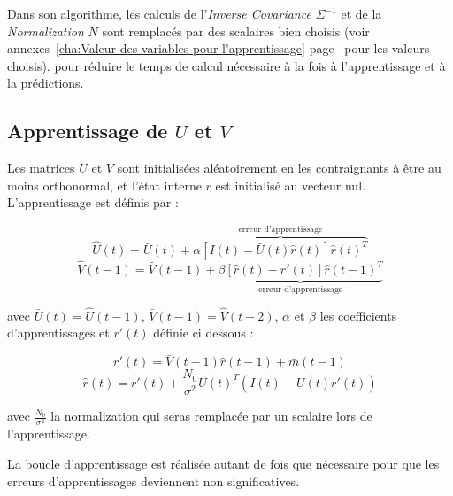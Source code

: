 Dans son algorithme, les calculs de l'\textit{Inverse Covariance} $\Sigma^{-1}$
et de la \textit{Normalization} $N$ sont remplacés par des scalaires bien
choisis (voir annexes~\ref{cha:Valeur des variables pour l'apprentissage}
page~\pageref{cha:Valeur des variables pour l'apprentissage} pour les valeurs
choisis).  pour réduire le temps de calcul nécessaire à la fois à
l'apprentissage et à la prédictions.


\subsection{Apprentissage de $U$ et $V$} %
\label{sub:Apprentissage de U et V}

Les matrices $U$ et $V$ sont initialisées aléatoirement en les contraignants
à être au moins orthonormal, et l'état interne $r$ est initialisé au vecteur
nul. L'apprentissage est définis par :

\begin{equation}
   \label{eqn:learning_U}
   \hat{U}(t) = \bar{U}(t) + \overbrace{\alpha[I(t) - \bar{U}(t)\hat{r}(t)]\hat{r}(t)^T}^\text{erreur d'apprentissage}
\end{equation}
\begin{equation}
   \label{eqn:learning_V}
   \hat{V}(t-1) = \bar{V}(t-1) + \underbrace{\beta[\hat{r}(t) - r'(t)]\hat{r}(t-1)^T}_\text{erreur d'apprentissage}
\end{equation}

avec $\bar{U}(t) = \hat{U}(t-1)$, $\bar{V}(t-1) = \hat{V}(t-2)$, $\alpha$ et
$\beta$ les coefficients d'apprentissages et $r'(t)$ définie ci dessous :

\begin{equation}
   \label{eqn:def_r_prime}
   r'(t) =  \bar{V}(t-1)\hat{r}(t-1) + \bar{m}(t-1)
\end{equation}
\begin{equation}
   \label{eqn:def_r_hat}
   \hat{r}(t) = r'(t) + \frac{N_0}{\sigma^2}\bar{U}(t)^T(I(t)-\bar{U}(t)r'(t))
\end{equation}

avec $\frac{N_0}{\sigma^2}$ la normalization qui seras remplacée par un scalaire lors
de l'apprentissage.

La boucle d'apprentissage est réalisée autant de fois que nécessaire pour que
les erreurs d'apprentissages deviennent non significatives.


